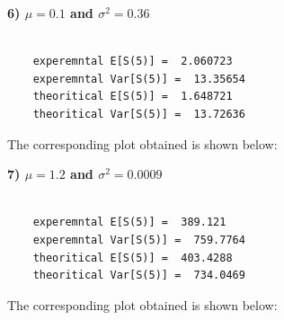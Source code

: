 \documentclass[12pt]{book}
\begin{document}
\newpage
\textbf{6) $\mu=0.1$ and $\sigma ^2=0.36$}\\\\
\begin{lstlisting}
	experemntal E[S(5)] =  2.060723 
	experemntal Var[S(5)] =  13.35654 
	theoritical E[S(5)] =  1.648721 
	theoritical Var[S(5)] =  13.72636 
\end{lstlisting}
The corresponding plot obtained is shown below:
\begin{figure}[H]
	\centering
\end{figure}
\newpage
\textbf{7) $\mu=1.2$ and $\sigma ^2=0.0009$}\\\\
\begin{lstlisting}
	experemntal E[S(5)] =  389.121 
	experemntal Var[S(5)] =  759.7764 
	theoritical E[S(5)] =  403.4288 
	theoritical Var[S(5)] =  734.0469 
\end{lstlisting}
The corresponding plot obtained is shown below:
\begin{figure}[H]
	\centering
\end{figure}
\end{document}
